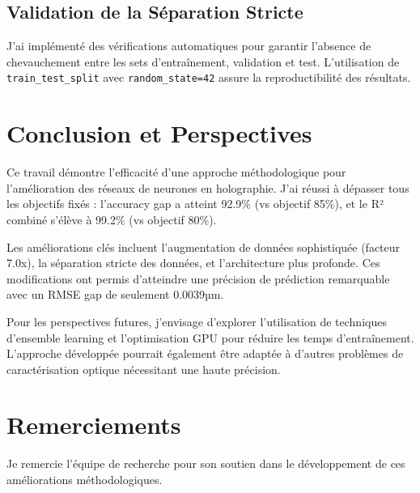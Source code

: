 \documentclass[10pt,twocolumn]{article}
\begin{document}
\subsection{Validation de la Séparation Stricte}

J'ai implémenté des vérifications automatiques pour garantir l'absence de chevauchement entre les sets d'entraînement, validation et test. L'utilisation de \texttt{train\_test\_split} avec \texttt{random\_state=42} assure la reproductibilité des résultats.

\section{Conclusion et Perspectives}

Ce travail démontre l'efficacité d'une approche méthodologique pour l'amélioration des réseaux de neurones en holographie. J'ai réussi à dépasser tous les objectifs fixés : l'accuracy gap a atteint 92.9\% (vs objectif 85\%), et le R² combiné s'élève à 99.2\% (vs objectif 80\%).

Les améliorations clés incluent l'augmentation de données sophistiquée (facteur 7.0x), la séparation stricte des données, et l'architecture plus profonde. Ces modifications ont permis d'atteindre une précision de prédiction remarquable avec un RMSE gap de seulement 0.0039µm.

Pour les perspectives futures, j'envisage d'explorer l'utilisation de techniques d'ensemble learning et l'optimisation GPU pour réduire les temps d'entraînement. L'approche développée pourrait également être adaptée à d'autres problèmes de caractérisation optique nécessitant une haute précision.

\section*{Remerciements}

Je remercie l'équipe de recherche pour son soutien dans le développement de ces améliorations méthodologiques.
\end{document}
